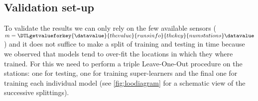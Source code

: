 \documentclass[11pt,a4paper,twoside]{article}
\newcommand{\perplexityinsert}[1]{\DTLgetvalueforkey{\datavalue}{thevalue}{runsinfo}{thekey}{#1}\datavalue}
\theoremstyle{definition}
\numberwithin{equation}{section}
\newcommand{\cX}{\ensuremath{\mathcal{X}}}
\newcommand{\bR}{\ensuremath{\mathbb{R}}}
\newcommand{\<}{\langle}
\renewcommand{\>}{\rangle}
\newcommand{\dist}{\operatorname{dist}}
\newcommand{\av}{\text{av}}
\newcommand{\obs}{\ensuremath{\text{obs}}}
\newcommand{\train}{\text{train}}
\newcommand{\val}{\text{val}}
\newcommand{\ascomment}[1]{{\color{teal} Agus: #1}}
\newcommand{\asmodif}[2]{{\color{teal} #1} {\sout{#2}}}
\newcommand{\om}[1]{\textcolor{blue}{#1}}
\begin{document}




\subsection{Validation set-up}
To validate the results we can only rely on the few available sensors ($m=\perplexityinsert{numstations}$) and it does not suffice to make a split of training and testing in time because we observed that models tend to over-fit the locations in which they where trained. For this we need to perform a triple Leave-One-Out procedure on the stations: one for testing, one for training super-learners and the final one for training each individual model (see \cref{fig:loodiagram} for a schematic view of the successive splittings).

\end{document}

